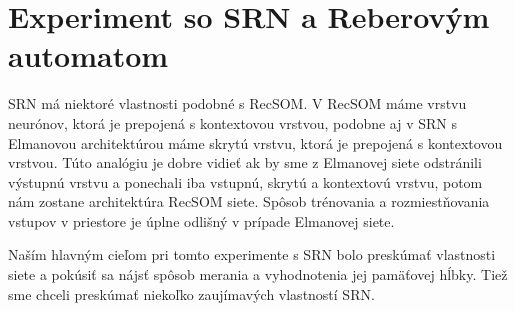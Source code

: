 \section{Experiment so SRN a Reberovým automatom}
SRN má niektoré vlastnosti podobné s RecSOM.
V RecSOM máme vrstvu neurónov, ktorá je prepojená s kontextovou vrstvou, podobne 
aj v SRN s Elmanovou architektúrou máme skrytú vrstvu, ktorá je prepojená s kontextovou vrstvou.
Túto analógiu je dobre vidieť ak by sme z Elmanovej siete odstránili výstupnú vrstvu a ponechali iba 
vstupnú, skrytú a kontextovú vrstvu, potom nám zostane architektúra RecSOM siete.
Spôsob trénovania a rozmiestňovania vstupov v priestore je úplne odlišný v prípade Elmanovej siete.

Naším hlavným cieľom pri tomto experimente s SRN bolo preskúmať vlastnosti siete a pokúsiť sa nájsť 
spôsob merania a vyhodnotenia jej pamäťovej hĺbky. 
Tiež sme chceli preskúmať niekoľko zaujímavých vlastností SRN.

